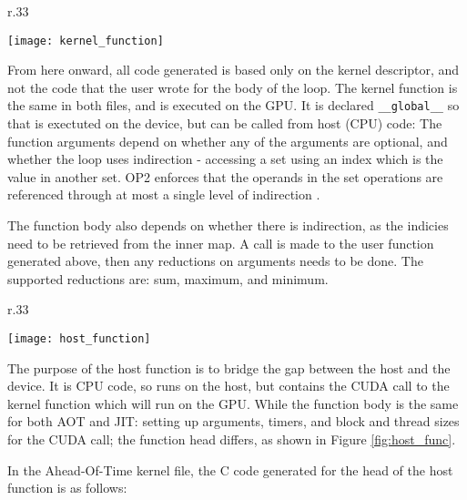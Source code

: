 \begin{wrapfigure}[17]{r}{.33\textwidth}
  \vspace{-1.2cm}
  \centering
  \caption{Kernel Function}
  \label{fig:krnl_func}
  \texttt{[image: kernel\_function]}
\end{wrapfigure}
From here onward, all code generated is based only on the kernel descriptor, and not the code that the user wrote for the body of the loop. The kernel function is the same in both files, and is executed on the GPU. It is declared \verb|__global__| so that is exectuted on the device, but can be called from host (CPU) code:
The function arguments depend on whether any of the arguments are optional, and whether the loop uses indirection - accessing a set using an index which is the value in another set. OP2 enforces that the operands in the set operations are referenced through at most a single level of indirection \cite[p4]{manual}.
\par
The function body also depends on whether there is indirection, as the indicies need to be retrieved from the inner map. A call is made to the user function generated above, then any reductions on arguments needs to be done. The supported reductions are: sum, maximum, and minimum\cite[p11]{manual}.

\begin{wrapfigure}[8]{r}{.33\textwidth}
  \vspace{-1.5cm}
  \centering
  \caption{Host Function}
  \label{fig:host_func}
  \texttt{[image: host\_function]}
\end{wrapfigure}
The purpose of the host function is to bridge the gap between the host and the device. It is CPU code, so runs on the host, but contains the CUDA call to the kernel function which will run on the GPU. While the function body is the same for both AOT and JIT: setting up arguments, timers, and block and thread sizes for the CUDA call; the function head differs, as shown in Figure \ref{fig:host_func}.
\vspace{\parskip}

In the Ahead-Of-Time kernel file, the C code generated for the head of the host function is as follows:

